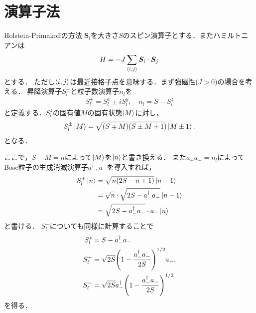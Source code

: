 \documentclass[\main/main.tex]{subfiles}
\begin{document}
\section{演算子法}
\begin{frame}{Holstein-Primakoffの方法}
    $\bm{S}_l$を大きさ$S$のスピン演算子とする．またハミルトニアンは
    \begin{align}
        H = -J \sum_{\expval{i,j}} \bm{S}_i \cdot \bm{S}_j
    \end{align}
    とする．
    ただし$\expval{i,j}$は最近接格子点を意味する．まず強磁性($J>0$)の場合を考える．
    昇降演算子$S_l^{\pm}$と粒子数演算子$n_l$を
    \begin{align}
        S_l^{\pm} = S_l^x \pm iS_l^y,
        \quad
        n_l = S - S_l^z
    \end{align}
    と定義する．$S_l^z$の固有値$M$の固有状態$\ket{M}$に対し，
    \begin{align}
        S_l^{\pm}\ket{M} = \sqrt{(S \mp M)(S \pm M + 1)}\ket{M \pm 1}.
    \end{align}
    となる．
\end{frame}

\begin{frame}
    ここで，$S-M = n$によって$\ket{M}$を$\ket{n}$と書き換える．
    また$a_-^\dagger a_- = n_l$によってBose粒子の生成消滅演算子$a_-^\dagger, a_-$を導入すれば，
    \begin{align*}
        S_l^+ \ket{n} &
        = \sqrt{n(2S-n+1)}\ket{n-1} 
        \\ &
        = \sqrt{n}\cdot\sqrt{2S-a_-^\dagger a_-}\ket{n-1}
        \\ &
        = \sqrt{2S-a_-^\dagger a_-}\cdot a_- \ket{n}
    \end{align*}
    と書ける．
    $S_l^-$についても同様に計算することで
    \begin{align}
        S_l^z &= S - a_-^\dagger a_-
        \label{HP method: def n}
        \\
        S_l^+ &= \sqrt{2S} \qty(1-\frac{a_-^\dagger a_-}{2S})^{1/2}a_-,
        \\
        S_l^- &= \sqrt{2S}a_-^\dagger \qty(1-\frac{a_-^\dagger a_-}{2S})^{1/2}
        \label{HP method: def a and a^dagger}
    \end{align}
    を得る．
\end{frame}
\end{document}
